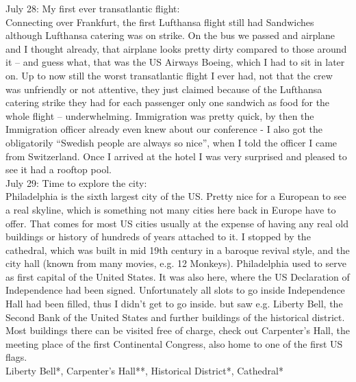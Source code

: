 July 28: My first ever transatlantic flight:\\
Connecting over Frankfurt, the first Lufthansa flight still had Sandwiches although Lufthansa catering was on strike. On the bus we passed and airplane and I thought already, that airplane looks pretty dirty compared to those around it -- and guess what, that was the US Airways Boeing, which I had to sit in later on. Up to now still the worst transatlantic flight I ever had, not that the crew was unfriendly or not attentive, they just claimed because of the Lufthansa catering strike they had for each passenger only one sandwich as food for the whole flight -- underwhelming. Immigration was pretty quick, by then the Immigration officer already even knew about our conference - I also got the obligatorily ``Swedish people are always so nice'', when I told the officer I came from Switzerland. Once I arrived at the hotel I was very surprised and pleased to see it had a rooftop pool.\\

July 29: Time to explore the city:\\
Philadelphia is the sixth largest city of the US. Pretty nice for a European to see a real skyline, which is something not many cities here back in Europe have to offer. That comes for most US cities usually at the expense of having any real old buildings or history of hundreds of years attached to it. I stopped by the cathedral, which was built in mid 19th century in a baroque revival style, and the city hall (known from many movies, e.g. 12 Monkeys). Philadelphia used to serve as first capital of the United States. It was also here, where the US Declaration of Independence had been signed. Unfortunately all slots to go inside Independence Hall had been filled, thus I didn't get to go inside. but saw e.g. Liberty Bell, the Second Bank of the United States and further buildings of the historical district. Most buildings there can be visited free of charge, check out Carpenter's Hall, the meeting place of the first Continental Congress, also home to one of the first US flags.\\

Liberty Bell*, Carpenter's Hall**, Historical District*, Cathedral*\\


